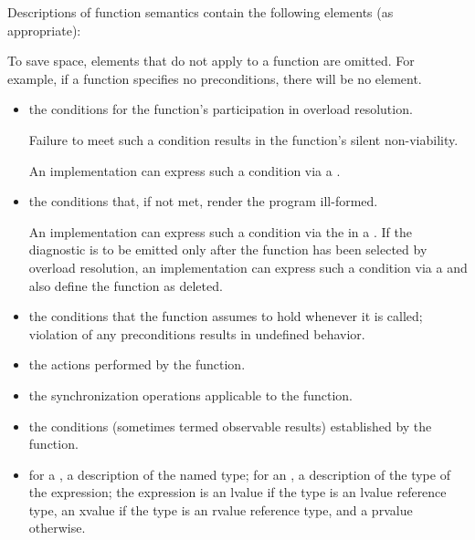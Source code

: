 \pnum
Descriptions of function semantics contain the following elements (as
appropriate):
\begin{footnote}
To save space, elements that do not apply to a function are omitted.
For example, if a function specifies no
preconditions, there will be no \expects element.
\end{footnote}
\begin{itemize}
\item
\constraints
the conditions for the function's participation
in overload resolution.
\begin{note}
Failure to meet such a condition results in the function's silent non-viability.
\end{note}
\begin{example}
An implementation can express such a condition
via a .
\end{example}

\item
\mandates
the conditions that, if not met, render the program ill-formed.
\begin{example}
An implementation can express such a condition
via the 
in a .
If the diagnostic is to be emitted only after the function
has been selected by overload resolution,
an implementation can express such a condition
via a 
and also define the function as deleted.
\end{example}

\item
\expects
the conditions
that the function assumes to hold whenever it is called;
violation of any preconditions results in undefined behavior.

\item
\effects
the actions performed by the function.

\item
\sync
the synchronization operations applicable to the function.

\item
\ensures
the conditions (sometimes termed observable results)
established by the function.

\item
\result
for a , a description of the named type;
for an ,
a description of the type of the expression;
the expression is an lvalue if the type is an lvalue reference type,
an xvalue if the type is an rvalue reference type, and
a prvalue otherwise.


\end{itemize}
